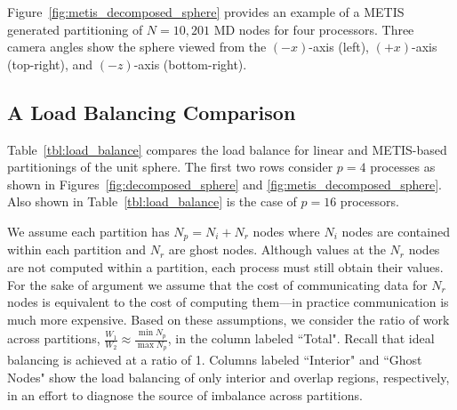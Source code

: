 \documentclass{report}
\begin{document}
Figure~\ref{fig:metis_decomposed_sphere} provides an example of a METIS generated partitioning of $N=10,201$ MD nodes for four processors. Three camera angles show the sphere viewed from the $(-x)$-axis (left), $(+x)$-axis (top-right), and $(-z)$-axis (bottom-right). 

\subsection{A Load Balancing Comparison}
\label{sec:load_balance}

Table~\ref{tbl:load_balance} compares the load balance for linear and METIS-based partitionings of the unit sphere. The first two rows consider $p=4$ processes as shown in Figures~\ref{fig:decomposed_sphere} and \ref{fig:metis_decomposed_sphere}. Also shown in Table~\ref{tbl:load_balance} is the case of $p=16$ processors. 

We assume each partition has $N_p = N_i + N_r$ nodes where $N_i$ nodes are contained within each partition and $N_r$ are ghost nodes. Although values at the $N_r$ nodes are not computed within a partition, each process must still obtain their values. For the sake of argument we assume that the cost of communicating data for $N_r$ nodes is equivalent to the cost of computing them---in practice communication is much more expensive. Based on these assumptions, we consider the ratio of work across partitions, $\frac{W_1}{W_2} \approx \frac{\min N_p}{\max N_p}$, in the column labeled ``Total". Recall that ideal balancing is achieved at a ratio of 1. Columns labeled ``Interior" and ``Ghost Nodes" show the load balancing of only interior and overlap regions, respectively, in an effort to diagnose the source of imbalance across partitions. 
\end{document}
